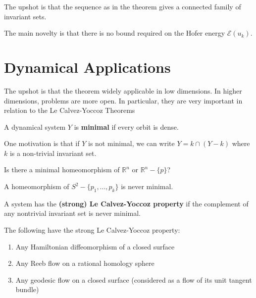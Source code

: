 The upshot is that the sequence as in the theorem gives a connected family of invariant sets.

\begin{remark}

The main novelty is that there is no bound required on the Hofer energy $\mathcal{E}(u_k)$.

\end{remark}

\section{Dynamical Applications}

The upshot is that the theorem widely applicable in low dimensions. In higher dimensions, problems are more open. In particular, they are very important in relation to the Le Calvez-Yoccoz Theorems

\begin{definition}
[Birkhoff]

A dynamical system $Y$ is \textbf{minimal} if every orbit is dense.

\end{definition}

One motivation is that if $Y$ is not minimal, we can write $Y=k \cap (Y-k)$ where $k$ is a non-trivial invariant set.

\begin{problem}
[Ulam]

Is there a minimal homeomorphism of $\mathbb{R}^n$ or $\mathbb{R}^n - \{p\}$?

\end{problem}

\begin{theorem}

A homeomorphism of $S^2-\{p_1,...,p_k\}$ is never minimal.

\end{theorem}

\begin{definition}

A system has the \textbf{(strong) Le Calvez-Yoccoz property} if the complement of any nontrivial invariant set is never minimal.

\end{definition}

\begin{theorem}

The following have the strong Le Calvez-Yoccoz property:

\begin{enumerate}
\item Any Hamiltonian diffeomorphism of a closed surface
\item Any Reeb flow on a rational homology sphere
\item Any geodesic flow on a closed surface (considered as a flow of its unit tangent bundle)
\end{enumerate}

\end{theorem}

